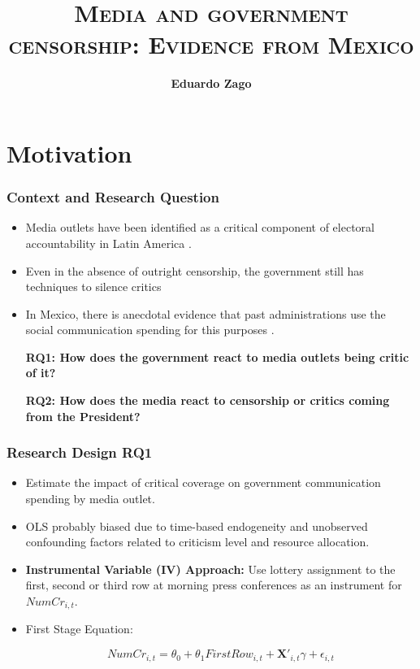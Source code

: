 \documentclass[12pt]{beamer}
\title{\Large\textsc{Media and government censorship: Evidence from Mexico}}
\author[Zago] %
{\textbf{Eduardo Zago}\inst{1}  \vspace{10pt}}
\institute []%
{  \inst{1}   PhD Student NYU Politics}
\date{\textsc{}}
\begin{document}
\maketitle









\section{Motivation}

\begin{frame}
\frametitle{Context and Research Question}

\small
\begin{itemize}
\item Media outlets have been identified as a critical component of electoral accountability in Latin America \citep{Audits-Ferraz-QJE, PolInfo-Enriquez-JEEA, Marshall}.
\item Even in the absence of outright censorship, the government still has techniques to silence critics \citep{Censor-Pratt-AER, Autocracy-Guriev-JPE}
\item In Mexico, there is anecdotal evidence that past administrations use the social communication spending for this purposes \citep{Times}.

\textbf{RQ1: How does the government react to media outlets being critic of it?}

\textbf{RQ2: How does the media react to censorship or critics coming from the President?}



\end{itemize}
\end{frame}

\begin{frame}
\frametitle{Research Design RQ1}

\small
\begin{itemize}
    \item Estimate the impact of critical coverage on government communication spending by media outlet.
    \item OLS probably biased due to time-based endogeneity and unobserved confounding factors related to criticism level and resource allocation.
    \item \textbf{Instrumental Variable (IV) Approach:} Use lottery assignment to the first, second or third row at morning press conferences as an instrument for $NumCr_{i, t}$.
\item First Stage Equation:

$$NumCr_{i, t} = \theta_0 + \theta_1 FirstRow_{i, t} + \mathbf{X'}_{i,t}\gamma + \epsilon_{i, t}$$
\end{itemize}
\end{frame}
\end{document}
